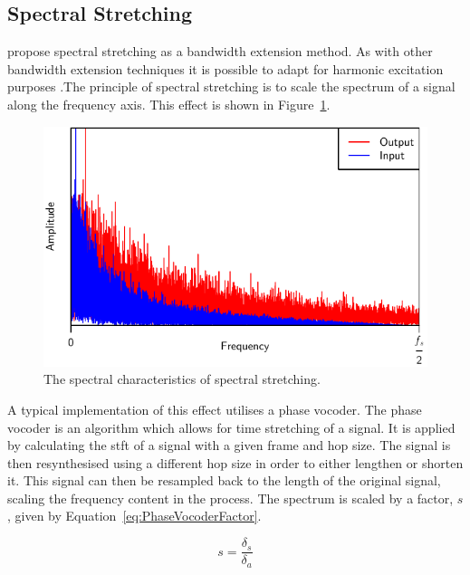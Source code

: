 	\subsection{Spectral Stretching}
	\label{sec:Excitation-Methods-SpectralStretching}
		\citet{nagel2009a} propose spectral stretching as a bandwidth extension method. As with other bandwidth
		extension techniques it is possible to adapt for harmonic excitation purposes .The principle of spectral
		stretching is to scale the spectrum of a signal along the frequency axis. This effect is shown in
		Figure~\ref{fig:SpectralStretching}.

		\begin{figure}[h!]
			\centering
			\includegraphics{chapter3/Images/SpectralStretchingSpectrum.pdf}
			\caption{The spectral characteristics of spectral stretching.}
			\label{fig:SpectralStretching}
		\end{figure}

		A typical implementation of this effect utilises a phase vocoder. The phase vocoder is an algorithm which
		allows for time stretching of a signal. It is applied by calculating the \acrfull{stft} of a signal with a
		given frame and hop size. The signal is then resynthesised using a different hop size in order to either
		lengthen or shorten it. This signal can then be resampled back to the length of the original signal,
		scaling the frequency content in the process. The spectrum is scaled by a factor, $s$, given by
		Equation~\ref{eq:PhaseVocoderFactor}.

		\begin{equation}
			s = \frac{\delta_{s}}{\delta_{a}}
			\label{eq:PhaseVocoderFactor}
		\end{equation}


